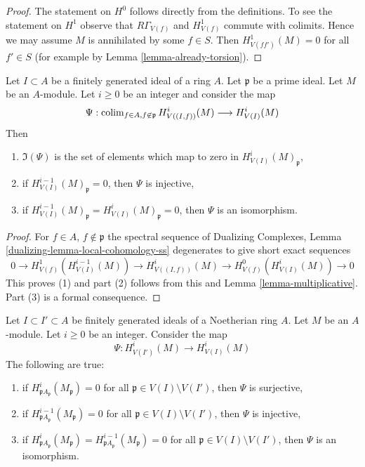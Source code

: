 \begin{proof}
The statement on $H^0$ follows directly from the definitions.
To see the statement on $H^1$ observe that $R\Gamma_{V(f)}$
and $H^1_{V(f)}$ commute with colimits. Hence we may assume
$M$ is annihilated by some $f \in S$. Then
$H^1_{V(ff')}(M) = 0$ for all $f' \in S$ (for example by
Lemma \ref{lemma-already-torsion}).
\end{proof}

\begin{lemma}
\label{lemma-elements-come-from-bigger}
Let $I \subset A$ be a finitely generated ideal of a ring $A$.
Let $\mathfrak p$ be a prime ideal. Let $M$ be an $A$-module.
Let $i \geq 0$ be an integer and consider the map
$$
\Psi :
\mathop{\mathrm{colim}}\nolimits_{f \in A, f \not \in \mathfrak p} H^i_{V((I, f))}(M)
\longrightarrow
H^i_{V(I)}(M)
$$
Then
\begin{enumerate}
\item $\Im(\Psi)$ is the set of elements which map to zero in
$H^i_{V(I)}(M)_\mathfrak p$,
\item if $H^{i - 1}_{V(I)}(M)_\mathfrak p = 0$, then $\Psi$ is injective,
\item if $H^{i - 1}_{V(I)}(M)_\mathfrak p = H^i_{V(I)}(M)_\mathfrak p = 0$,
then $\Psi$ is an isomorphism.
\end{enumerate}
\end{lemma}

\begin{proof}
For $f \in A$, $f \not \in \mathfrak p$ the spectral sequence of
Dualizing Complexes, Lemma \ref{dualizing-lemma-local-cohomology-ss}
degenerates to give short exact sequences
$$
0 \to H^1_{V(f)}(H^{i - 1}_{V(I)}(M)) \to
H^i_{V((I, f))}(M) \to H^0_{V(f)}(H^i_{V(I)}(M)) \to 0
$$
This proves (1) and part (2) follows from this and
Lemma \ref{lemma-multiplicative}.
Part (3) is a formal consequence.
\end{proof}

\begin{lemma}
\label{lemma-isomorphism}
Let $I \subset I' \subset A$ be finitely generated ideals of a
Noetherian ring $A$. Let $M$ be an $A$-module. Let $i \geq 0$ be an integer.
Consider the map
$$
\Psi : H^i_{V(I')}(M) \to H^i_{V(I)}(M)
$$
The following are true:
\begin{enumerate}
\item if $H^i_{\mathfrak pA_\mathfrak p}(M_\mathfrak p) = 0$
for all $\mathfrak p \in V(I) \setminus V(I')$, then
$\Psi$ is surjective,
\item if $H^{i - 1}_{\mathfrak pA_\mathfrak p}(M_\mathfrak p) = 0$
for all $\mathfrak p \in V(I) \setminus V(I')$, then
$\Psi$ is injective,
\item if $H^i_{\mathfrak pA_\mathfrak p}(M_\mathfrak p) =
H^{i - 1}_{\mathfrak pA_\mathfrak p}(M_\mathfrak p) = 0$
for all $\mathfrak p \in V(I) \setminus V(I')$, then
$\Psi$ is an isomorphism.
\end{enumerate}
\end{lemma}

